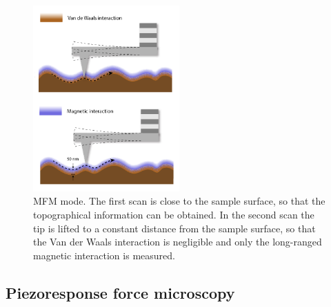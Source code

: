 \documentclass[pdflatex, sectionletters, 12pt]{pittetd}    %
\begin{document}
\begin{figure}[h!]
	\centering
	\includegraphics[width=0.5\textwidth]{Drawing/MFM.pdf}
	\caption{MFM mode. The first scan is close to the sample surface, so that the topographical information can be obtained. In the second scan the tip is lifted to a constant distance from the sample surface, so that the Van der Waals interaction is negligible and only the long-ranged magnetic interaction is measured.}
	\label{FIG:MFM}
\end{figure}

\subsection{Piezoresponse force microscopy}
\end{document}

